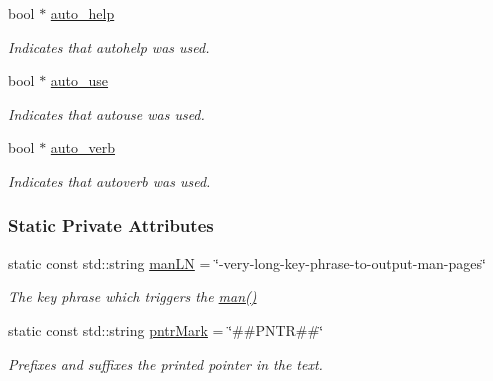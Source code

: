 \begin{DoxyCompactItemize}
bool $\ast$ \hyperlink{classpoptmx_1_1OptionTable_ac2e25d315d20c51f227ae6b256e0e8f9}{auto\_\-help}
\begin{DoxyCompactList}\small\item\em Indicates that autohelp was used. \item\end{DoxyCompactList}\item 
bool $\ast$ \hyperlink{classpoptmx_1_1OptionTable_ae6a353a7f18bdf76b7e408e014fc6883}{auto\_\-use}
\begin{DoxyCompactList}\small\item\em Indicates that autouse was used. \item\end{DoxyCompactList}\item 
bool $\ast$ \hyperlink{classpoptmx_1_1OptionTable_acfd37d94b34e7b3262dbcb47ec2d9a51}{auto\_\-verb}
\begin{DoxyCompactList}\small\item\em Indicates that autoverb was used. \item\end{DoxyCompactList}\end{DoxyCompactItemize}
\subsubsection*{Static Private Attributes}
\begin{DoxyCompactItemize}
\item 
static const std::string \hyperlink{classpoptmx_1_1OptionTable_a22f4a6d7722fedd31d7e51387945c7f5}{manLN} = \char`\"{}-\/very-\/long-\/key-\/phrase-\/to-\/output-\/man-\/pages\char`\"{}
\begin{DoxyCompactList}\small\item\em The key phrase which triggers the \hyperlink{classpoptmx_1_1OptionTable_ac87bd15ce01d4629fb70e28d71393b2b}{man()} \item\end{DoxyCompactList}\item 
static const std::string \hyperlink{classpoptmx_1_1OptionTable_aa7bc68b6c6c485432febb607beb85ec1}{pntrMark} = \char`\"{}\#\#PNTR\#\#\char`\"{}
\begin{DoxyCompactList}\small\item\em Prefixes and suffixes the printed pointer in the text. \item\end{DoxyCompactList}\end{DoxyCompactItemize}


